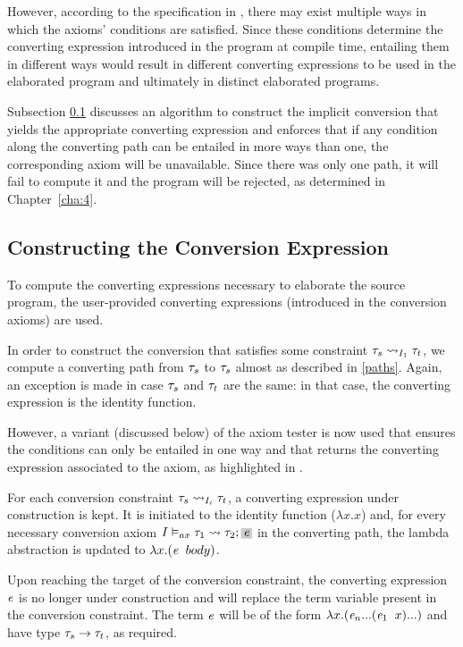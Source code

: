 However, according to the specification in , there may exist multiple ways in which the axioms' conditions are satisfied. Since these conditions determine the converting expression introduced in the program at compile time, entailing them in different ways would result in different converting expressions to be used in the elaborated program and ultimately in distinct elaborated programs.

Subsection \ref{constr} discusses an algorithm to construct the implicit conversion that yields the appropriate converting expression and enforces that if any condition along the converting path can be entailed in more ways than one, the corresponding axiom will be unavailable. Since there was only one path, it will fail to compute it and the program will be rejected, as determined in Chapter~\ref{cha:4}.

\subsection{Constructing the Conversion Expression}
\label{constr}
To compute the converting expressions necessary to elaborate the source program, the user-provided converting expressions (introduced in the conversion axioms) are used.

In order to construct the conversion that satisfies some constraint $\convX{\imEnv_1}{\type_s}{\type_t}$, we compute a converting path from $\type_s$ to $\type_s$ almost as described in \ref{paths}. Again, an exception is made in case $\type_{s}$ and $\type_{t}$ are the same: in that case, the converting expression is the identity function.

However, a variant (discussed below) of the axiom tester is now used that ensures the conditions can only be entailed in one way and that returns the converting expression associated to the axiom, as highlighted in .

For each conversion constraint $\convX{\imEnv_i}{\type_{s}}{\type_{t}}$, a converting expression under construction is kept. It is initiated to the identity function ($\lambda x. x$) and, for every necessary conversion axiom $\convax{\imEnv}{\type_1}{\type_2}{\term}$ in the converting path, the lambda abstraction is updated to $\lambda x . (\term \;\;body)$.

Upon reaching the target of the conversion constraint, the converting expression $\term$ is no longer under construction and will replace the term variable present in the conversion constraint. The term $\term$ will be of the form $\lambda x . (\term_n ... (\term_1\;\;x)...)$ and have type $\type_s \to \type_t$, as required.

